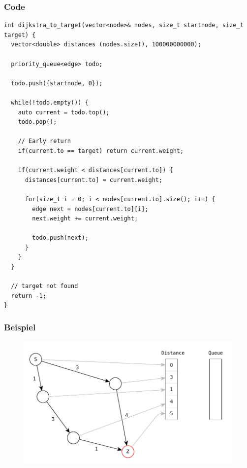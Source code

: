 \begin{frame}[fragile]
\frametitle{Code}
\begin{lstlisting}[basicstyle=\tiny]
int dijkstra_to_target(vector<node>& nodes, size_t startnode, size_t target) {
  vector<double> distances (nodes.size(), 100000000000);

  priority_queue<edge> todo;

  todo.push({startnode, 0});
  
  while(!todo.empty()) {
    auto current = todo.top();
    todo.pop();

    // Early return
    if(current.to == target) return current.weight;

    if(current.weight < distances[current.to]) {
      distances[current.to] = current.weight;

      for(size_t i = 0; i < nodes[current.to].size(); i++) {
        edge next = nodes[current.to][i];
        next.weight += current.weight;

        todo.push(next);
      }
    }
  }

  // target not found
  return -1;
}
\end{lstlisting}

\end{frame}

\begin{frame}
\frametitle{Beispiel}
\begin{figure}
\includegraphics[scale=.8]{dijkstra_graphs/dijkstra_0.pdf}
\end{figure}
\end{frame}

